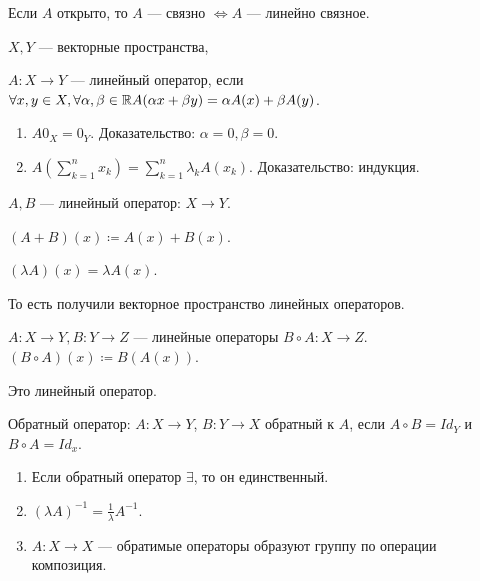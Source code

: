 \begin{remark}
    Если $A$ открыто, то  $A$ --- связно  $\iff A$ --- линейно связное.
\end{remark}
\begin{definition}
    $X, Y$ --- векторные пространства,  

    $A\!: X \to Y$ --- линейный оператор, если $\forall x, y \in X, \forall \alpha, \beta \in \mathbb{R} A(\alpha x + \beta y) = \alpha A(x) + \beta A(y)$.
\end{definition}
\begin{properties}
\begin{enumerate}
    \item $A 0_X = 0_Y$. Доказательство: $\alpha = 0, \beta = 0$.
    \item $A (\sum\limits_{k=1}^n x_k) = \sum\limits_{k=1}^n \lambda_k A(x_k)$. Доказательство: индукция.
\end{enumerate}
\end{properties}
\begin{definition}
    $A, B$ --- линейный оператор:  $X \to Y$.

     $(A+B)(x) \coloneqq A(x) + B(x)$.

      $(\lambda A)(x) = \lambda A(x)$. 

      То есть получили векторное пространство линейных операторов.
\end{definition}
\begin{definition}
    $A\!: X \to Y, B\!: Y \to Z$ --- линейные операторы  $B \circ A\!: X \to Z$.  $(B \circ A)(x) \coloneqq B(A(x))$.
\end{definition}
\begin{remark}
    Это линейный оператор.
\end{remark}
\begin{definition}
    Обратный оператор: $A\!: X \to Y$,  $B\!: Y \to X$ обратный к  $A$, если  $A \circ B = Id_Y$ и  $B \circ A = Id_x$.
\end{definition}
\begin{properties}
    \begin{enumerate}
        \item Если обратный оператор $\exists$, то он единственный.
        \item  $(\lambda A)^{-1} = \frac{1}{\lambda} A^{-1}$.
        \item $A\!: X \to X$ --- обратимые операторы образуют группу по операции композиция.
    \end{enumerate}
\end{properties}
